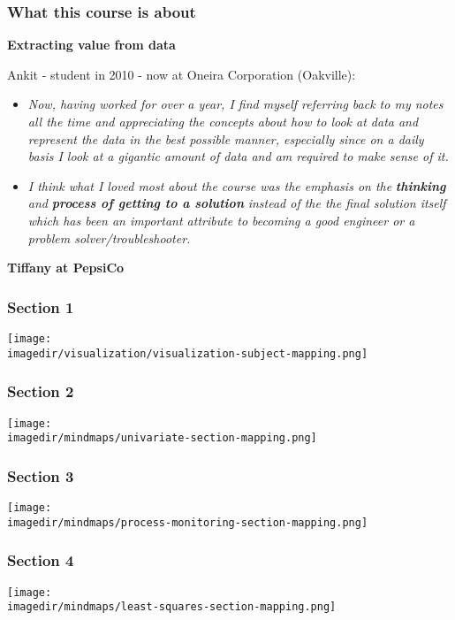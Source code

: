 \begin{frame}\frametitle{What this course is about}
	
	\textbf{Extracting value from data}
	
	Ankit - student in 2010 - now at Oneira Corporation (Oakville):
	\begin{itemize}
		\item	\emph{Now, having worked for over a year, I find myself referring back to my notes all the time and appreciating the concepts about how to look at data and represent the data in the best possible manner, especially since on a daily basis I look at a gigantic amount of data and am required to make sense of it.} 
	\end{itemize}
	\begin{itemize}
		\item	\emph{I think what I loved most about the course was the emphasis on the} \textbf{\emph{thinking}} \emph{and} \textbf{\emph{process of getting to a solution}} \emph{instead of the the final solution itself which has been an important attribute to becoming a good engineer or a problem solver/troubleshooter.} 
	\end{itemize}
	
	\vspace{12pt}
	\textbf{Tiffany at PepsiCo}
\end{frame}

\begin{frame}\frametitle{Section 1}
	
	\texttt{[image: \\imagedir/visualization/visualization-subject-mapping.png]}
\end{frame}

\begin{frame}\frametitle{Section 2}
	
	\texttt{[image: \\imagedir/mindmaps/univariate-section-mapping.png]}
\end{frame}

\begin{frame}\frametitle{Section 3}
	
	\texttt{[image: \\imagedir/mindmaps/process-monitoring-section-mapping.png]}
\end{frame}

\begin{frame}\frametitle{Section 4}
	
	\texttt{[image: \\imagedir/mindmaps/least-squares-section-mapping.png]}
\end{frame}

